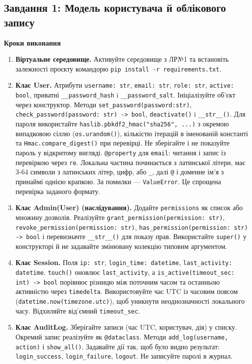 \documentclass[10pt, a4paper]{article}
\begin{document}
\subsection{Завдання 1: Модель користувача й облікового запису}
\textbf{Кроки виконання}
\begin{enumerate}
	\item \textbf{Віртуальне середовище.} Активуйте середовище з ЛР№1 та встановіть залежності проєкту командорю \verb|pip install -r requirements.txt|.
	\item \textbf{Клас User.} Атрибути \verb|username: str|, \verb|email: str|, \verb|role: str|, \verb|active: bool|, приватні \verb|__password_hash| i \verb|__password_salt|. Ініціалізуйте об'єкт через конструктор. Методи \verb|set_password(password:str)|, \verb|check_password(password: str) -> bool|, \verb|deactivate()| i \verb|__str__()|. Для пароля використайте \verb|haslib.pbkdf2_hmac("sha256", ...)| з окремою випадковою сіллю (\verb|os.urandom()|), кількістю ітерацій в іменованій константі та \verb|Hmac.compare_digest()| при перевірці. Не зберігайте і не показуйте пароль у відкритому вигляді. \verb|@property| для \verb|email|: читання і запис із перевіркою через \verb|re|. Локальна частина починається з латинської літери, має 3-64 символи з латинських літер, цифр, або \verb|_|, далі \verb|@| і доменне ім'я з принаймі однією крапкою. За помилки --- \verb|ValueError|. Це спрощена перевірка заданого формату.
	\item \textbf{Клас Admin(User) (наслідування).} Додайте \verb|permissions| як список або множину дозволів. Реалізуйте \verb|grant_permission(permission: str)|, \verb|revoke_permission(permission: str)|, \verb|has_permission(permission: str) -> bool| і перевизначте \verb|__str__()| для показу прав. Використайте \verb|super()| у конструкторі й не задавайте змінювану колекцію типовим аргументом.
	\item \textbf{Клас Session.} Поля \verb|ip: str|, \verb|login_time: datetime|, \verb|last_activity: datetime|. \verb|touch()| оновлює \verb|last_activity|, а \verb|is_active(timeout_sec: int) -> bool| порівнює різницю між поточним часом та останньою активністю через \verb|timedelta|. Використовуйте час UTC із часовим поясом (\verb|datetime.now(timezone.utc)|), щоб уникнути неоднозначності локального часу. Відхиляйте від'ємний \verb|timeout_sec|.
	\item \textbf{Клас AuditLog.} Зберігайте записи (час UTC, користувач, дія) у списку. Окремий запис реалізуйте як \verb|@dataclass|. Методи \verb|add_log(username, action)| і \verb|show_all()|. Задавайте дії так, щоб було видно результат: \verb|login_success|, \verb|login_failure|, \verb|logout|. Не записуйте паролі в журнал.

\end{enumerate}
\end{document}
